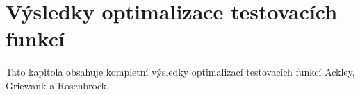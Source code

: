 






\chapter{Výsledky optimalizace testovacích funkcí}
Tato kapitola obsahuje kompletní výsledky optimalizací testovacích funkcí Ackley, Griewank a Rosenbrock.

